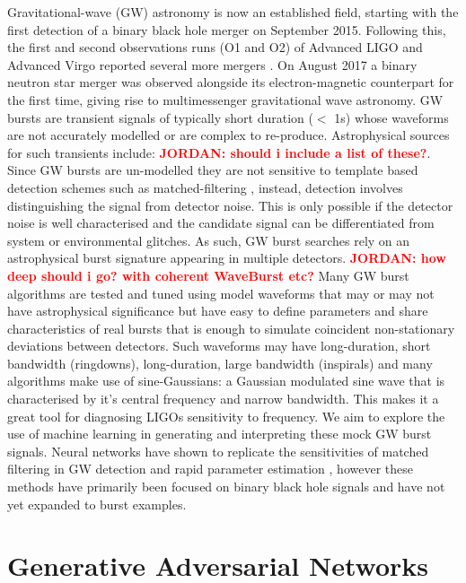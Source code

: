 \documentclass[12pt]{iopart}
\newcommand{\jordan}[1]{\textbf{\textcolor{red}{JORDAN: #1}}}
\begin{document}
Gravitational-wave (GW) astronomy is now an established field, starting with the first detection of a binary black hole merger \cite{} on September 2015. Following this, the first and second observations runs (O1 and O2) of Advanced LIGO and Advanced Virgo reported several more mergers \cite{}. On August 2017 a binary neutron star merger was observed alongside its electron-magnetic counterpart for the first time, giving rise to multimessenger gravitational wave astronomy. 
GW bursts are transient signals of typically short duration ($<$ 1s) whose waveforms are not accurately modelled or are complex to re-produce. Astrophysical sources for such transients include: \jordan{should i include a list of these?}. Since GW bursts are un-modelled they are not sensitive to template based detection schemes such as matched-filtering \cite{}, instead, detection involves distinguishing the signal from detector noise. This is only possible if the detector noise is well characterised and the candidate signal can be differentiated from system or environmental glitches. As such, GW burst searches rely on an astrophysical burst signature appearing in multiple detectors. \jordan{how deep should i go? with coherent WaveBurst etc?}
Many GW burst algorithms \cite{cite the shit outta this} are tested and tuned using model waveforms that may or may not have astrophysical significance but have easy to define parameters and share characteristics of real bursts that is enough to simulate coincident non-stationary deviations between detectors. Such waveforms may have long-duration, short bandwidth (ringdowns), long-duration, large bandwidth (inspirals) and many algorithms make use of sine-Gaussians: a Gaussian modulated sine wave that is characterised by it's central frequency and narrow bandwidth. This makes it a great tool for diagnosing LIGOs sensitivity to frequency. 
We aim to explore the use of machine learning in generating and interpreting these mock GW burst signals. Neural networks have shown to replicate the sensitivities of matched filtering in GW detection \cite{} and rapid parameter estimation \cite{}, however these methods have primarily been focused on binary black hole signals and have not yet expanded to burst examples. 

\section{Generative Adversarial Networks}
\end{document}
